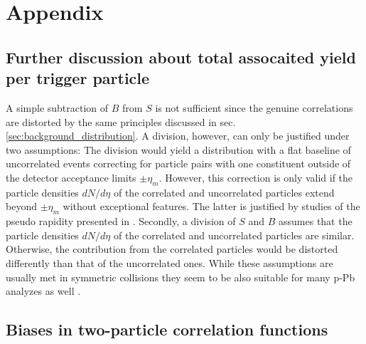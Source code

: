 
\chapter{Appendix}
\label{chap:appendix}

\section{Further discussion about total assocaited yield per trigger particle}
\label{sec:in_depth_Y}

 A simple subtraction of $B$ from $S$ is not sufficient since the genuine correlations are distorted by the same principles discussed in sec. \ref{sec:background_distribution}. A division, however, can only be justified under two assumptions: The division would yield a distribution with a flat baseline of uncorrelated events correcting for particle pairs with one constituent outside of the detector acceptance limits $\pm\eta_m$. However, this correction is only valid if the particle densities $dN/d\eta$ of the correlated and uncorrelated particles extend beyond $\pm \eta_m$ without exceptional features. The latter is justified by studies of the pseudo rapidity presented in \cite{ALICECollaboration2012}.
Secondly, a division of $S$ and $B$ assumes that the particle densities $dN/d\eta$ of the correlated and uncorrelated particles are similar. Otherwise, the contribution from the correlated particles would be distorted differently than that of the uncorrelated ones.
While these assumptions are usually met in symmetric collisions they seem to be also suitable for many p-Pb analyzes as well \cite{ATLASCollaboration2012,Abelev2012,CMSCollaborationChatrchyan2013}.


\section{Biases in two-particle correlation functions}
\label{sec:st_shortcomings}

